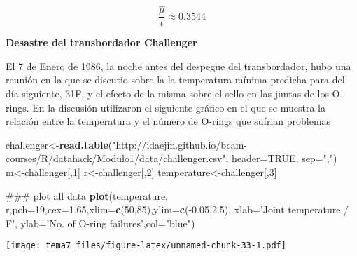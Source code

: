 \documentclass[]{article}
\newenvironment{Shaded}{\begin{snugshade}}{\end{snugshade}}
\newcommand{\KeywordTok}[1]{\textcolor[rgb]{0.13,0.29,0.53}{\textbf{{#1}}}}
\newcommand{\DataTypeTok}[1]{\textcolor[rgb]{0.13,0.29,0.53}{{#1}}}
\newcommand{\DecValTok}[1]{\textcolor[rgb]{0.00,0.00,0.81}{{#1}}}
\newcommand{\FloatTok}[1]{\textcolor[rgb]{0.00,0.00,0.81}{{#1}}}
\newcommand{\StringTok}[1]{\textcolor[rgb]{0.31,0.60,0.02}{{#1}}}
\newcommand{\OtherTok}[1]{\textcolor[rgb]{0.56,0.35,0.01}{{#1}}}
\newcommand{\NormalTok}[1]{{#1}}
\numberwithin{equation}{section}
\begin{document}
\[
 \frac{\hat{\mu}}{t} \approx 0.3544
\]

\textbf{Desastre del transbordador Challenger}

El 7 de Enero de 1986, la noche antes del despegue del transbordador,
hubo una reunión en la que se discutio sobre la la temperatura mínima
predicha para del día siguiente, 31F, y el efecto de la misma sobre el
sello en las juntas de los O-rings. En la discusión utilizaron el
siguiente gráfico en el que se muestra la relación entre la temperatura
y el número de O-rings que sufrian problemas

\begin{Shaded}
\begin{Highlighting}[]
\NormalTok{challenger<-}\KeywordTok{read.table}\NormalTok{(}\StringTok{"http://idaejin.github.io/bcam-courses/R/datahack/Modulo1/data/challenger.csv"}\NormalTok{, }\DataTypeTok{header=}\OtherTok{TRUE}\NormalTok{, }\DataTypeTok{sep=}\StringTok{","}\NormalTok{)}
\NormalTok{m<-challenger[,}\DecValTok{1}\NormalTok{]}
\NormalTok{r<-challenger[,}\DecValTok{2}\NormalTok{]}
\NormalTok{temperature<-challenger[,}\DecValTok{3}\NormalTok{]}

\NormalTok{### plot all data}
\KeywordTok{plot}\NormalTok{(temperature, r,}\DataTypeTok{pch=}\DecValTok{19}\NormalTok{,}\DataTypeTok{cex=}\FloatTok{1.65}\NormalTok{,}\DataTypeTok{xlim=}\KeywordTok{c}\NormalTok{(}\DecValTok{50}\NormalTok{,}\DecValTok{85}\NormalTok{),}\DataTypeTok{ylim=}\KeywordTok{c}\NormalTok{(-}\FloatTok{0.05}\NormalTok{,}\FloatTok{2.5}\NormalTok{),}
     \DataTypeTok{xlab=}\StringTok{'Joint temperature / F'}\NormalTok{, }\DataTypeTok{ylab=}\StringTok{'No. of O-ring failures'}\NormalTok{,}\DataTypeTok{col=}\StringTok{"blue"}\NormalTok{)}
\end{Highlighting}
\end{Shaded}

\texttt{[image: tema7\_files/figure-latex/unnamed-chunk-33-1.pdf]}
\end{document}
